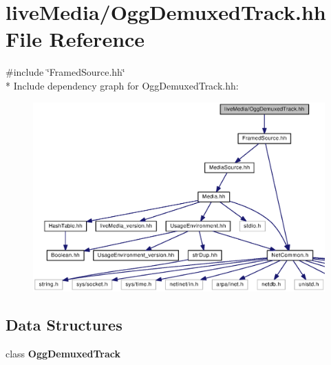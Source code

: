 \section{live\+Media/\+Ogg\+Demuxed\+Track.hh File Reference}
\label{OggDemuxedTrack_8hh}
{\ttfamily \#include \char`\"{}Framed\+Source.\+hh\char`\"{}}\\*
Include dependency graph for Ogg\+Demuxed\+Track.\+hh\+:
\nopagebreak
\begin{figure}[H]
\begin{center}
\leavevmode
\includegraphics[width=350pt]{OggDemuxedTrack_8hh__incl}
\end{center}
\end{figure}
\subsection*{Data Structures}
\begin{DoxyCompactItemize}
\item 
class {\bf Ogg\+Demuxed\+Track}
\end{DoxyCompactItemize}
